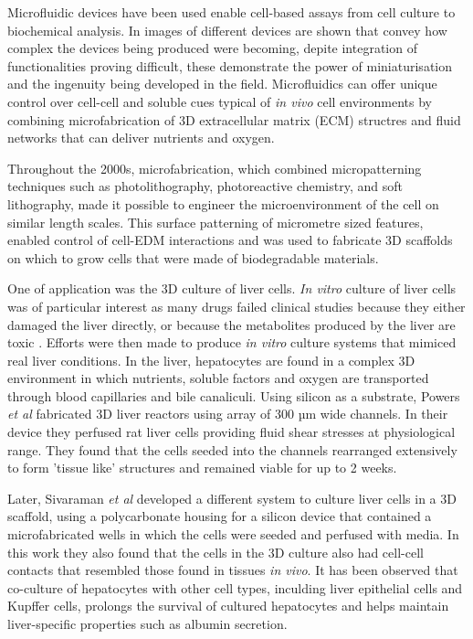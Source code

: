 Microfluidic devices have been used enable cell-based assays from cell culture to biochemical analysis. In
 images of different devices are shown that convey how complex the devices being
produced were becoming, depite integration of functionalities proving difficult, these demonstrate the
power of miniaturisation and the ingenuity being developed in the field.
Microfluidics can offer unique control over cell-cell and soluble cues typical of
\textit{in vivo} cell environments by combining microfabrication of 3D extracellular matrix (ECM)
structres and fluid networks that can deliver nutrients and oxygen.

Throughout the 2000s, microfabrication, which combined micropatterning techniques such as
photolithography, photoreactive chemistry, and soft lithography, made it possible to engineer the
microenvironment of the cell on similar length scales\citep{folch2000microengineering}. This surface
patterning of micrometre sized features, enabled control of cell-EDM interactions and was used
to fabricate 3D scaffolds on which to grow cells that were made of biodegradable
materials\citep{tsang2004three}.

One of application was the 3D culture of liver cells. \textit{In vitro} culture
of liver cells was of particular interest as many drugs failed clinical studies because they
either damaged the liver directly, or because the metabolites produced by the liver are toxic
\citep{sivaraman2005microscale}. Efforts were then made to produce \textit{in vitro} culture
systems that mimiced real liver conditions. In the liver, hepatocytes are found in a complex
3D environment in which nutrients, soluble factors and oxygen are transported through blood
capillaries and bile canaliculi. Using silicon as a substrate, Powers \textit{et al} fabricated
3D liver reactors using array of 300 µm wide channels\citep{powers2002microfabricated}. In their
device they perfused rat liver cells providing fluid shear stresses at physiological range. They found
that the cells seeded into the channels rearranged extensively to form 'tissue like' structures and
remained viable for up to 2 weeks.

Later, Sivaraman \textit{et al} developed a different system to culture liver cells in a 3D scaffold,
using a polycarbonate housing for a silicon device that contained a microfabricated wells in which the
cells were seeded and perfused with media. In this work they also found that the cells in the 3D culture
also had cell-cell contacts that resembled those found in tissues \textit{in
vivo}\citep{sivaraman2005microscale}. It has been observed that co-culture of hepatocytes with other cell types, inculding liver epithelial cells and Kupffer cells, prolongs the survival of cultured hepatocytes and helps maintain liver-specific properties such as albumin secretion\citep{guguen1983maintenance}.

